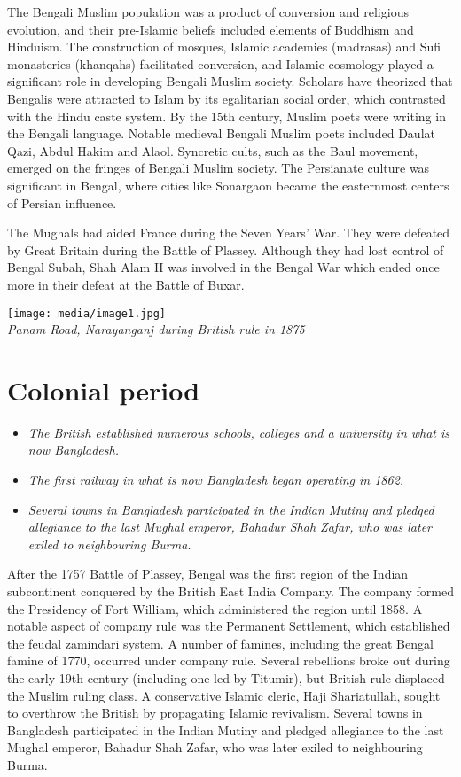 The Bengali Muslim population was a product of conversion and religious
evolution, and their pre-Islamic beliefs included elements of Buddhism
and Hinduism. The construction of mosques, Islamic academies (madrasas)
and Sufi monasteries (khanqahs) facilitated conversion, and Islamic
cosmology played a significant role in developing Bengali Muslim
society. Scholars have theorized that Bengalis were attracted to Islam
by its egalitarian social order, which contrasted with the Hindu caste
system. By the 15th century, Muslim poets were writing in the Bengali
language. Notable medieval Bengali Muslim poets included Daulat Qazi,
Abdul Hakim and Alaol. Syncretic cults, such as the Baul movement,
emerged on the fringes of Bengali Muslim society. The Persianate culture
was significant in Bengal, where cities like Sonargaon became the
easternmost centers of Persian influence.

The Mughals had aided France during the Seven Years' War. They were
defeated by Great Britain during the Battle of Plassey. Although they
had lost control of Bengal Subah, Shah Alam II was involved in the
Bengal War which ended once more in their defeat at the Battle of Buxar.

\texttt{[image: media/image1.jpg]}\\
\emph{Panam Road, Narayanganj during British rule in 1875}

\section{Colonial period}\label{colonial-period}

\begin{itemize}
\item
  \emph{The British established numerous schools, colleges and a
  university in what is now Bangladesh.}
\item
  \emph{The first railway in what is now Bangladesh began operating in
  1862.}
\item
  \emph{Several towns in Bangladesh participated in the Indian Mutiny
  and pledged allegiance to the last Mughal emperor, Bahadur Shah Zafar,
  who was later exiled to neighbouring Burma.}
\end{itemize}

After the 1757 Battle of Plassey, Bengal was the first region of the
Indian subcontinent conquered by the British East India Company. The
company formed the Presidency of Fort William, which administered the
region until 1858. A notable aspect of company rule was the Permanent
Settlement, which established the feudal zamindari system. A number of
famines, including the great Bengal famine of 1770, occurred under
company rule. Several rebellions broke out during the early 19th century
(including one led by Titumir), but British rule displaced the Muslim
ruling class. A conservative Islamic cleric, Haji Shariatullah, sought
to overthrow the British by propagating Islamic revivalism. Several
towns in Bangladesh participated in the Indian Mutiny and pledged
allegiance to the last Mughal emperor, Bahadur Shah Zafar, who was later
exiled to neighbouring Burma.

